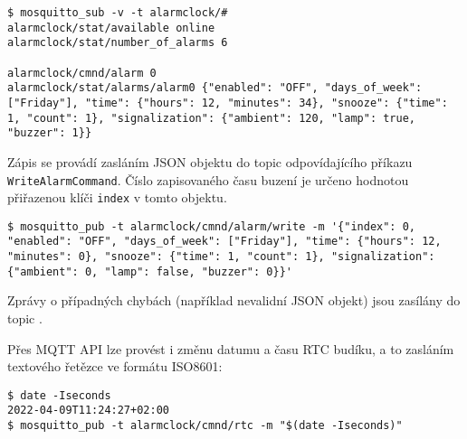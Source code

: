\begin{lstlisting}[style=terminal]
$ mosquitto_sub -v -t alarmclock/#
alarmclock/stat/available online
alarmclock/stat/number_of_alarms 6

alarmclock/cmnd/alarm 0
alarmclock/stat/alarms/alarm0 {"enabled": "OFF", "days_of_week": ["Friday"], "time": {"hours": 12, "minutes": 34}, "snooze": {"time": 1, "count": 1}, "signalization": {"ambient": 120, "lamp": true, "buzzer": 1}}
\end{lstlisting}

Zápis se provádí zasláním JSON objektu do topic odpovídajícího příkazu
\texttt{WriteAlarmCommand}. Číslo zapisovaného času buzení je určeno hodnotou
přiřazenou klíči \texttt{index} v tomto objektu.
\begin{lstlisting}[style=terminal]
$ mosquitto_pub -t alarmclock/cmnd/alarm/write -m '{"index": 0, "enabled": "OFF", "days_of_week": ["Friday"], "time": {"hours": 12, "minutes": 0}, "snooze": {"time": 1, "count": 1}, "signalization": {"ambient": 0, "lamp": false, "buzzer": 0}}'
\end{lstlisting}
Zprávy o případných chybách (například nevalidní JSON objekt) jsou zasílány do
topic .

Přes MQTT API lze provést i změnu datumu a času \acs{RTC} budíku, a to zasláním
textového řetězce ve formátu ISO8601:
\begin{lstlisting}[style=terminal]
$ date -Iseconds
2022-04-09T11:24:27+02:00
$ mosquitto_pub -t alarmclock/cmnd/rtc -m "$(date -Iseconds)"
\end{lstlisting}



